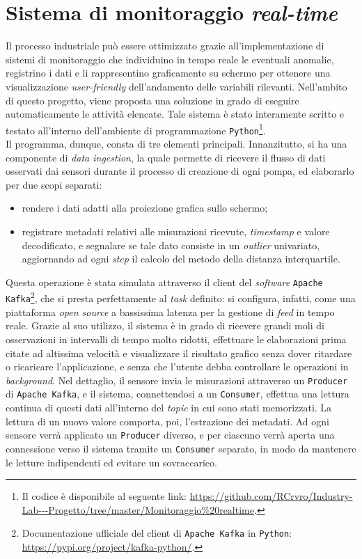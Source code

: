 \documentclass[fleqn,10pt]{SelfArx} %
\begin{document}
\section{Sistema di monitoraggio \textit{real-time}}\label{rt}
Il processo industriale può essere ottimizzato grazie all'implementazione di sistemi di monitoraggio che individuino in tempo reale le eventuali anomalie, registrino i dati e li rappresentino graficamente su schermo per ottenere una visualizzazione \textit{user-friendly} dell'andamento delle variabili rilevanti. Nell'ambito di questo progetto, viene proposta una soluzione in grado di eseguire automaticamente le attività elencate. Tale sistema è stato interamente scritto e testato all'interno dell'ambiente di programmazione \texttt{Python}\footnote{Il codice è disponibile al seguente link: \url{https://github.com/RCrvro/Industry-Lab---Progetto/tree/master/Monitoraggio\%20realtime}.}.\\
Il programma, dunque, consta di tre elementi principali. Innanzitutto, si ha una componente di \textit{data ingestion}, la quale permette di ricevere il flusso di dati osservati dai sensori durante il processo di creazione di ogni pompa, ed elaborarlo per due scopi separati:
    \begin{itemize}
        \item rendere i dati adatti alla proiezione grafica sullo schermo;
        \item registrare metadati relativi alle misurazioni ricevute, \textit{timestamp} e valore decodificato, e segnalare se tale dato consiste in un \textit{outlier} univariato, aggiornando ad ogni \textit{step} il calcolo del metodo della distanza interquartile. 
    \end{itemize}
Questa operazione è stata simulata attraverso il client del \textit{software} \texttt{Apache Kafka}\footnote{Documentazione ufficiale del client di \texttt{Apache Kafka} in \texttt{Python}: \url{https://pypi.org/project/kafka-python/}.}, che si presta perfettamente al \textit{task} definito: si configura, infatti, come una piattaforma \textit{open source} a bassissima latenza per la gestione di \textit{feed} in tempo reale. Grazie al suo utilizzo, il sistema è in grado di ricevere grandi moli di osservazioni in intervalli di tempo molto ridotti, effettuare le elaborazioni prima citate ad altissima velocità e visualizzare il risultato grafico senza dover ritardare o ricaricare l'applicazione, e senza che l'utente debba controllare le operazioni in \textit{background}. Nel dettaglio, il sensore invia le misurazioni attraverso un \texttt{Producer} di \texttt{Apache Kafka}, e il sistema, connettendosi a un \texttt{Consumer}, effettua una lettura continua di questi dati all'interno del \textit{topic} in cui sono stati memorizzati. La lettura di un nuovo valore comporta, poi, l'estrazione dei metadati. Ad ogni sensore verrà applicato un \texttt{Producer} diverso, e per ciascuno verrà aperta una connessione verso il sistema tramite un \texttt{Consumer} separato, in modo da mantenere le letture indipendenti ed evitare un sovraccarico.\\
\end{document}
